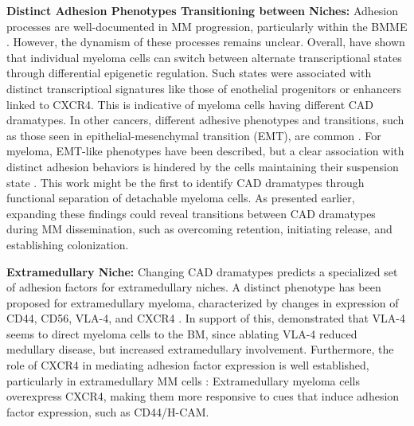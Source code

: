 \textbf{Distinct Adhesion Phenotypes Transitioning between Niches:}
Adhesion processes are well-documented in MM progression, particularly within
the \ac{BMME} \cite{bouzerdanAdhesionMoleculesMultiple2022}. However, the
dynamism of these processes remains unclear. Overall,
\citet{fredeDynamicTranscriptionalReprogramming2021} have shown that individual
myeloma cells can switch between alternate transcriptional states through
differential epigenetic regulation. Such states were associated with distinct
transcriptioal signatures like those of enothelial progenitors or enhancers
linked to CXCR4. This is indicative of myeloma cells having different \ac{CAD}
dramatypes. In other cancers, different adhesive phenotypes and transitions,
such as those seen in epithelial-mesenchymal transition (EMT), are common
\cite{gengDynamicSwitchTwo2014}. For myeloma, EMT-like phenotypes have been
described, but a clear association with distinct adhesion behaviors is hindered
by the cells maintaining their suspension state
\cite{roccaroCXCR4RegulatesExtraMedullary2015,
      qianSETDB1InducesLenalidomide2023}. This work might be the first to identify
\ac{CAD} dramatypes through functional separation of detachable myeloma cells.
As presented earlier, expanding these findings could reveal transitions between
\ac{CAD} dramatypes during MM dissemination, such as overcoming retention,
initiating release, and establishing colonization.


\textbf{Extramedullary Niche:}
Changing \ac{CAD} dramatypes predicts a specialized set of adhesion factors for
extramedullary niches. A distinct phenotype has been proposed for extramedullary
myeloma, characterized by changes in
expression of CD44, CD56, VLA-4, and CXCR4
\cite{guptaExtramedullaryMultipleMyeloma2022}. In support of this,
\cite{hathiAblationVLA4Multiple2022} demonstrated that VLA-4 seems to direct
myeloma cells to the BM, since ablating VLA-4 reduced medullary disease, but
increased extramedullary involvement. Furthermore, the role of CXCR4 in
mediating adhesion factor expression is well established, particularly in
extramedullary MM cells \cite{roccaroCXCR4RegulatesExtraMedullary2015,
      guptaExtramedullaryMultipleMyeloma2022}: Extramedullary myeloma cells
overexpress CXCR4, making them more responsive to cues that induce adhesion
factor expression, such as CD44/H-CAM.



